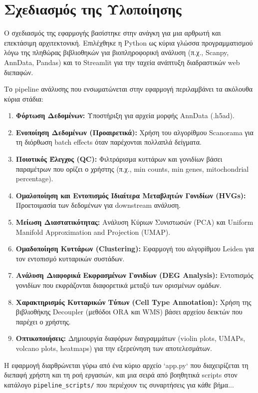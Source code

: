 \documentclass[12pt, a4paper]{article}
\begin{document}
\section{Σχεδιασμός της Υλοποίησης}
\label{sec:sxediasmos}
Ο σχεδιασμός της εφαρμογής βασίστηκε στην ανάγκη για μια αρθρωτή και επεκτάσιμη αρχιτεκτονική. 
Επιλέχθηκε η Python ως κύρια γλώσσα προγραμματισμού λόγω της πληθώρας βιβλιοθηκών για βιοπληροφορική ανάλυση (π.χ., Scanpy, AnnData, Pandas) και το Streamlit για την ταχεία ανάπτυξη διαδραστικών web διεπαφών.

Το pipeline ανάλυσης που ενσωματώνεται στην εφαρμογή περιλαμβάνει τα ακόλουθα κύρια στάδια:
\begin{enumerate}[label=\arabic*.]
    \item \textbf{Φόρτωση Δεδομένων:} Υποστήριξη για αρχεία μορφής AnnData (.h5ad).
    \item \textbf{Ενοποίηση Δεδομένων (Προαιρετικά):} Χρήση του αλγορίθμου Scanorama για τη διόρθωση batch effects όταν παρέχονται πολλαπλά δείγματα.
    \item \textbf{Ποιοτικός Έλεγχος (QC):} Φιλτράρισμα κυττάρων και γονιδίων βάσει παραμέτρων που ορίζει ο χρήστης (π.χ., min counts, min genes, mitochondrial percentage).
    \item \textbf{Ομαλοποίηση και Εντοπισμός Ιδιαίτερα Μεταβλητών Γονιδίων (HVGs):} Προετοιμασία των δεδομένων για downstream ανάλυση.
    \item \textbf{Μείωση Διαστατικότητας:} Ανάλυση Κύριων Συνιστωσών (PCA) και Uniform Manifold Approximation and Projection (UMAP).
    \item \textbf{Ομαδοποίηση Κυττάρων (Clustering):} Εφαρμογή του αλγορίθμου Leiden για τον εντοπισμό κυτταρικών συστάδων.
    \item \textbf{Ανάλυση Διαφορικά Εκφρασμένων Γονιδίων (DEG Analysis):} Εντοπισμός γονιδίων που εκφράζονται διαφορετικά μεταξύ των ορισμένων ομάδων.
    \item \textbf{Χαρακτηρισμός Κυτταρικών Τύπων (Cell Type Annotation):} Χρήση της βιβλιοθήκης Decoupler (μεθόδοι ORA και WMS) βάσει αρχείου δεικτών που παρέχει ο χρήστης.
    \item \textbf{Οπτικοποιήσεις:} Δημιουργία διαφόρων διαγραμμάτων (violin plots, UMAPs, volcano plots, heatmaps) για την εξερεύνηση των αποτελεσμάτων.
\end{enumerate}

Η εφαρμογή διαρθρώνεται γύρω από ένα κύριο αρχείο `app.py` που διαχειρίζεται τη διεπαφή χρήστη και τη ροή εργασιών, και μια σειρά από βοηθητικά scripts στον κατάλογο \texttt{pipeline\_scripts/} που περιέχουν τις συναρτήσεις για κάθε βήμα...
\end{document}

